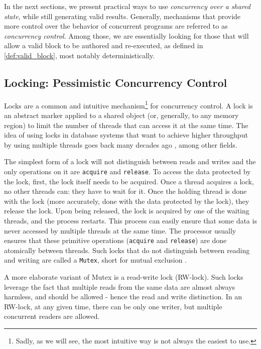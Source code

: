 In the next sections, we present practical ways to use \textit{concurrency over a shared state},
while still generating valid results. Generally, mechanisms that provide more control over the
behavior of concurrent programs are referred to as  \textit{concurrency control}. Among those, we
are essentially looking for those that will allow a valid block to be authored and re-executed, as
defined in \ref{def:valid_block}, most notably deterministically.

\subsection{Locking: Pessimistic Concurrency Control} \label{chap_bg:subsec:lock}

Locks are a common and intuitive mechanism\footnote{Sadly, as we will see, the most intuitive way is
not always the easiest to use.} for concurrency control. A lock is an abstract marker applied to a
shared object (or, generally, to any memory region) to limit the number of threads that can access
it at the same time. The idea of using locks in database systems that want to achieve higher
throughput by using multiple threads goes back many decades ago
\cite{kedemControllingConcurrencyUsing1979, morrisPerformanceAnalysisLocking1985}, among other
fields.

The simplest form of a lock will not distinguish between reads and writes and the only operations on
it are \texttt{acquire} and \texttt{release}. To access the data protected by the lock, first, the
lock itself needs to be acquired. Once a thread acquires a lock, no other threads can: they have to
wait for it. Once the holding thread is done with the lock (more accurately, done with the data
protected by the lock), they release the lock. Upon being released, the lock is acquired by one of
the waiting threads, and the process restarts. This process can easily ensure that some data is
never accessed by multiple threads at the same time. The processor usually ensures that these
primitive operations (\texttt{acquire} and \texttt{release}) are done atomically between threads.
Such locks that do not distinguish between reading and writing are called a \texttt{Mutex}, short
for mutual exclusion \cite{guerraouiLockUnlockThat2019}.

A more elaborate variant of Mutex is a read-write lock (RW-lock). Such locks leverage the fact that
multiple reads from the same data are almost always harmless, and should be allowed - hence the read
and write distinction. In an RW-lock, at any given time, there can be only one writer, but multiple
concurrent readers are allowed.

